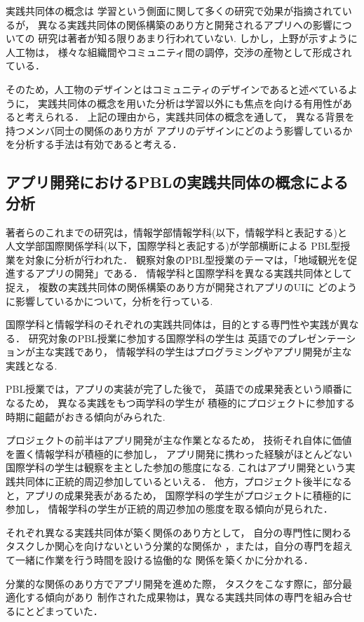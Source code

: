 \documentclass[submit,techrep]{ipsj}
\begin{document}
実践共同体の概念は
学習という側面に関して多くの研究で効果が指摘されているが，
異なる実践共同体の関係構築のあり方と開発されるアプリへの影響についての
研究は著者が知る限りあまり行われていない.
しかし，上野\cite{book11}が示すように人工物は，
様々な組織間やコミュニティ間の調停，交渉の産物として形成されている．


そのため，人工物のデザインとはコミュニティのデザインであると述べているように，
実践共同体の概念を用いた分析は学習以外にも焦点を向ける有用性があると考えられる．
上記の理由から，実践共同体の概念を通して，
異なる背景を持つメンバ同士の関係のあり方が
アプリのデザインにどのよう影響しているかを分析する手法は有効であると考える．

\subsection{アプリ開発におけるPBLの実践共同体の概念による分析}
著者らのこれまでの研究は，情報学部情報学科(以下，情報学科と表記する)と
人文学部国際関係学科(以下，国際学科と表記する)が学部横断による
PBL型授業を対象に分析が行われた．
観察対象のPBL型授業のテーマは，「地域観光を促進するアプリの開発」である．
情報学科と国際学科を異なる実践共同体として捉え，
複数の実践共同体の関係構築のあり方が開発されアプリのUIに
どのように影響しているかについて，分析を行っている\cite{book12}.

国際学科と情報学科のそれぞれの実践共同体は，目的とする専門性や実践が異なる．
研究対象のPBL授業に参加する国際学科の学生は
英語でのプレゼンテーションが主な実践であり，
情報学科の学生はプログラミングやアプリ開発が主な実践となる.
　

PBL授業では，アプリの実装が完了した後で，
英語での成果発表という順番になるため，
異なる実践をもつ両学科の学生が
積極的にプロジェクトに参加する時期に齟齬がおきる傾向がみられた.


プロジェクトの前半はアプリ開発が主な作業となるため，
技術それ自体に価値を置く情報学科が積極的に参加し，
アプリ開発に携わった経験がほとんどない国際学科の学生は観察を主とした参加の態度になる.
これはアプリ開発という実践共同体に正統的周辺参加しているといえる．
他方，プロジェクト後半になると，アプリの成果発表があるため，
国際学科の学生がプロジェクトに積極的に参加し，
情報学科の学生が正統的周辺参加の態度を取る傾向が見られた．

それぞれ異なる実践共同体が築く関係のあり方として，
自分の専門性に関わるタスクしか関心を向けないという分業的な関係か
，または，自分の専門を超えて一緒に作業を行う時間を設ける協働的な
関係を築くかに分かれる．


分業的な関係のあり方でアプリ開発を進めた際，
タスクをこなす際に，部分最適化する傾向があり
制作された成果物は，異なる実践共同体の専門を組み合せるにとどまっていた．
\end{document}
